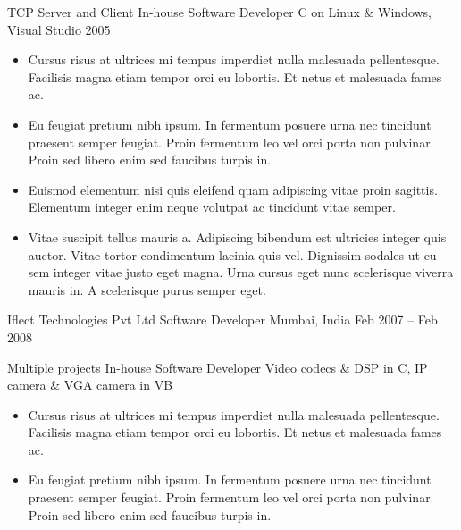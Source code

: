 \documentclass[10pt, a4paper]{sivu}
\begin{document}
        \dividergray
        
        \project
            {TCP Server and Client}
            {In-house}
            {Software Developer}
            {C on Linux \& Windows, Visual Studio 2005}
    
            \begin{itemize}
                \item Cursus risus at ultrices mi tempus imperdiet nulla malesuada pellentesque. Facilisis magna etiam tempor orci eu lobortis. Et netus et malesuada fames ac.\smallskip
                
                \item Eu feugiat pretium nibh ipsum. In fermentum posuere urna nec tincidunt praesent semper feugiat. Proin fermentum leo vel orci porta non pulvinar. Proin sed libero enim sed faucibus turpis in. 
                
                \item Euismod elementum nisi quis eleifend quam adipiscing vitae proin sagittis. Elementum integer enim neque volutpat ac tincidunt vitae semper. 
                
                \item Vitae suscipit tellus mauris a. Adipiscing bibendum est ultricies integer quis auctor. Vitae tortor condimentum lacinia quis vel. Dignissim sodales ut eu sem integer vitae justo eget magna. Urna cursus eget nunc scelerisque viverra mauris in. A scelerisque purus semper eget. 
            \end{itemize}

\smallskip
\divider
\smallskip

    \company
        {Iflect Technologies Pvt Ltd}
        {Software Developer}
        {Mumbai, India}
        {Feb 2007 – Feb 2008}
        
        \project
            {Multiple projects}
            {In-house}
            {Software Developer}
            {Video codecs \& DSP in C, IP camera \& VGA camera in VB}
    
            \begin{itemize}
                \item Cursus risus at ultrices mi tempus imperdiet nulla malesuada pellentesque. Facilisis magna etiam tempor orci eu lobortis. Et netus et malesuada fames ac. \smallskip
                \item Eu feugiat pretium nibh ipsum. In fermentum posuere urna nec tincidunt praesent semper feugiat. Proin fermentum leo vel orci porta non pulvinar. Proin sed libero enim sed faucibus turpis in.\smallskip
            \end{itemize}
\end{document}
